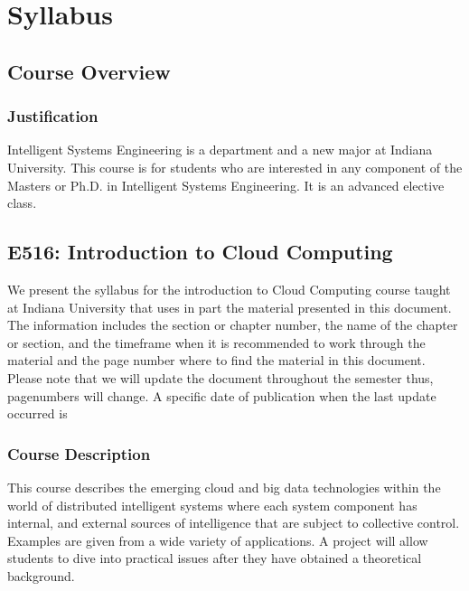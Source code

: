 \part{Syllabus}

\chapter{Course Overview}


\section{Justification}

Intelligent Systems Engineering is a department and a new major at
Indiana University. This course is for students who are interested in
any component of the Masters or Ph.D. in Intelligent Systems
Engineering. It is an advanced elective class.


\chapter{E516: Introduction to Cloud Computing}

We present the syllabus for the introduction to Cloud Computing course
taught at Indiana University that uses in part the material presented
in this document. The information includes the section or chapter
number, the name of the chapter or section, and the timeframe when it
is recommended to work through the material and the page number where
to find the material in this document. Please note that we will update
the document throughout the semester thus, pagenumbers will change. A
specific date of publication when the last update occurred is

\TODAY

\section{Course Description}

This course describes the emerging cloud and big data technologies
within the world of distributed intelligent systems where each system
component has internal, and external sources of intelligence that are
subject to collective control. Examples are given from a wide variety
of applications. A project will allow students to dive into practical
issues after they have obtained a theoretical background.

